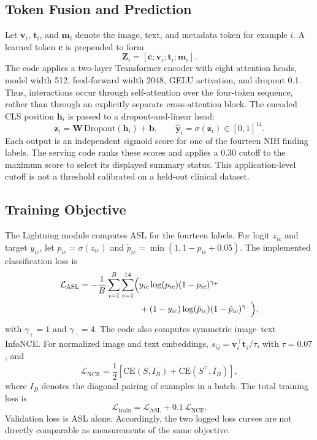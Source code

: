 \documentclass[conference]{IEEEtran}
\begin{document}
\subsection{Token Fusion and Prediction}
Let $\mathbf{v}_i$, $\mathbf{t}_i$, and $\mathbf{m}_i$ denote the image, text, and metadata token for example $i$. A learned token $\mathbf{c}$ is prepended to form
\[
\mathbf{Z}_i = [\mathbf{c};\mathbf{v}_i;\mathbf{t}_i;\mathbf{m}_i].
\]
The code applies a two-layer Transformer encoder with eight attention heads, model width 512, feed-forward width 2048, GELU activation, and dropout 0.1. Thus, interactions occur through self-attention over the four-token sequence, rather than through an explicitly separate cross-attention block. The encoded CLS position $\mathbf{h}_i$ is passed to a dropout-and-linear head:
\[
\mathbf{z}_i = \mathbf{W}\,\mathrm{Dropout}(\mathbf{h}_i)+\mathbf{b},
\qquad
\hat{\mathbf{y}}_i = \sigma(\mathbf{z}_i)\in[0,1]^{14}.
\]
Each output is an independent sigmoid score for one of the fourteen NIH finding labels. The serving code ranks these scores and applies a 0.30 cutoff to the maximum score to select its displayed summary status. This application-level cutoff is not a threshold calibrated on a held-out clinical dataset.

\subsection{Training Objective}
The Lightning module computes ASL for the fourteen labels. For logit $z_{ic}$ and target $y_{ic}$, let $p_{ic}=\sigma(z_{ic})$ and $\tilde{p}_{ic}=\min(1,1-p_{ic}+0.05)$. The implemented classification loss is
\begin{equation}
\begin{aligned}
\mathcal{L}_{\mathrm{ASL}} =
-\frac{1}{B}\sum_{i=1}^{B}\sum_{c=1}^{14}
\Bigl(&y_{ic}\log(p_{ic})(1-p_{ic})^{\gamma_+}\\
&+(1-y_{ic})\log(\tilde{p}_{ic})(1-\tilde{p}_{ic})^{\gamma_-}\Bigr),
\end{aligned}
\label{eq:asl}
\end{equation}
with $\gamma_+=1$ and $\gamma_-=4$. The code also computes symmetric image--text InfoNCE. For normalized image and text embeddings, $s_{ij}=\mathbf{v}_i^\top\mathbf{t}_j/\tau$, with $\tau=0.07$, and
\begin{equation}
\mathcal{L}_{\mathrm{NCE}} =
\frac{1}{2}\left[
\mathrm{CE}(S,I_B)+\mathrm{CE}(S^\top,I_B)
\right],
\label{eq:nce}
\end{equation}
where $I_B$ denotes the diagonal pairing of examples in a batch. The total training loss is
\begin{equation}
\mathcal{L}_{\mathrm{train}} =
\mathcal{L}_{\mathrm{ASL}}+0.1\,\mathcal{L}_{\mathrm{NCE}}.
\label{eq:total}
\end{equation}
Validation loss is ASL alone. Accordingly, the two logged loss curves are not directly comparable as measurements of the same objective.
\end{document}

